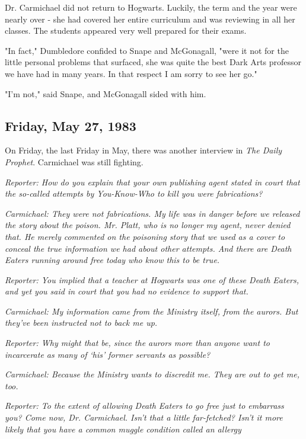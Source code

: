 Dr. Carmichael did not return to Hogwarts. Luckily, the term and the year were nearly over - she had covered her entire curriculum and was reviewing in all her classes. The students appeared very well prepared for their exams.

"In fact," Dumbledore confided to Snape and McGonagall, "were it not for the little personal problems that surfaced, she was quite the best Dark Arts professor we have had in many years. In that respect I am sorry to see her go."

"I'm not," said Snape, and McGonagall sided with him.

\subsection{Friday, May 27, 1983}

On Friday, the last Friday in May, there was another interview in \emph{The Daily Prophet}. Carmichael was still fighting.

\emph{Reporter: How do you explain that your own publishing agent stated in court that the so-called attempts by You-Know-Who to kill you were fabrications?}

\emph{Carmichael: They were not fabrications. My life was in danger before we released the story about the poison. Mr. Platt, who is no longer my agent, never denied that. He merely commented on the poisoning story that we used as a cover to conceal the true information we had about other attempts. And there are Death Eaters running around free today who know this to be true.}

\emph{Reporter: You implied that a teacher at Hogwarts was one of these Death Eaters, and yet you said in court that you had no evidence to support that.}

\emph{Carmichael: My information came from the Ministry itself, from the aurors. But they've been instructed not to back me up.}

\emph{Reporter: Why might that be, since the aurors more than anyone want to incarcerate as many of `his' former servants as possible?}

\emph{Carmichael: Because the Ministry wants to discredit me. They are out to get me, too.}

\emph{Reporter: To the extent of allowing Death Eaters to go free just to embarrass you? Come now, Dr. Carmichael. Isn't that a little far-fetched? Isn't it more likely that you have a common muggle condition called an allergy{\el}}

